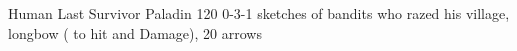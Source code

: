 \filledCS%
  {\currentName}%
  {Human}%
  {Last Survivor}%
  {Paladin}%
  {{1}{2}{0}}%
  {{0}{-3}{-1}}%
  {%
    \renewcommand\rank{Fodder}
    \renewcommand\characterDebt{100 \glspl{sp}}
    \setcounter{Cultivation}{2}
    \setcounter{Performance}{1}
    \setcounter{Stealth}{1}
    \setcounter{Brawl}{1}
    \setcounter{Projectiles}{1}
    \flail
  }%
  {\unstoppable}%
  {sketches of bandits who razed his \gls{village}, longbow ( to hit and Damage), 20 arrows}%


